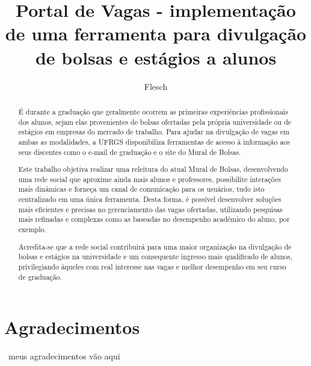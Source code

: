 \documentclass[cic,tc]{iiufrgs}
\title{Portal de Vagas - implementação de uma ferramenta para divulgação de bolsas e estágios a alunos}
\author{Flesch}{Jean Ampos}
\begin{document}
\maketitle


\chapter*{Agradecimentos}
~meus agradecimentos vão aqui~



\begin{abstract}
    É durante a graduação que geralmente ocorrem as primeiras experiências profissionais dos alunos, sejam elas provenientes de bolsas ofertadas pela própria universidade ou de estágios em empresas do mercado de trabalho. Para ajudar na divulgação de vagas em ambas as modalidades, a UFRGS disponibiliza ferramentas de acesso à informação aos seus discentes como o e-mail de graduação e o site do Mural de Bolsas.
    
    Este  trabalho  objetiva realizar  uma  releitura  do atual Mural  de  Bolsas, desenvolvendo  uma rede social que aproxime ainda mais alunos e professores, possibilite interações mais dinâmicas e forneça um canal de comunicação para os usuários, tudo isto centralizado em uma única ferramenta. Desta forma, é possível desenvolver soluções mais eficientes e precisas no gerenciamento das vagas ofertadas, utilizando pesquisas mais refinadas e complexas como as baseadas no desempenho acadêmico do aluno, por exemplo.
    
    Acredita-se que a rede social contribuirá para uma maior organização na divulgação de bolsas e estágios na universidade e um consequente ingresso mais qualificado de alunos, privilegiando àqueles com real interesse nas vagas e melhor desempenho em seu curso de graduação.
    \newline
\end{abstract}
\end{document}
